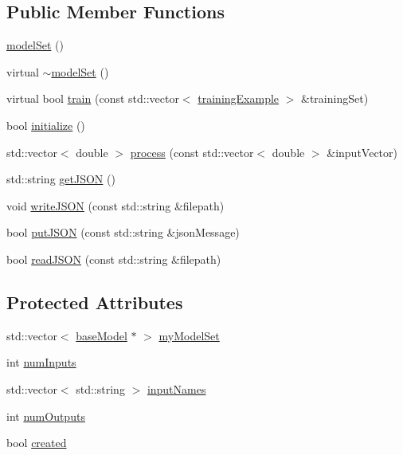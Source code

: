 \subsection*{Public Member Functions}
\begin{DoxyCompactItemize}
\item 
\hyperlink{classmodel_set_ae44cba85f4c52e7d05e0f622b3ea9030}{model\+Set} ()
\item 
virtual \hyperlink{classmodel_set_a21eadb6e6cdd54dda57a4a94582bfe7b}{$\sim$model\+Set} ()
\item 
virtual bool \hyperlink{classmodel_set_a7620f95e8e29d547e7c688da51b33d9c}{train} (const std\+::vector$<$ \hyperlink{structtraining_example}{training\+Example} $>$ \&training\+Set)
\item 
bool \hyperlink{classmodel_set_afefb50a0fe8f45821c6a7599784d7eb4}{initialize} ()
\item 
std\+::vector$<$ double $>$ \hyperlink{classmodel_set_a3b95db9f976d19764665e0761cae4a3c}{process} (const std\+::vector$<$ double $>$ \&input\+Vector)
\item 
std\+::string \hyperlink{classmodel_set_a031987885b1462ec7d7dbeef0c803d97}{get\+J\+S\+ON} ()
\item 
void \hyperlink{classmodel_set_a8e2b783240dded1be8fad921b10707bf}{write\+J\+S\+ON} (const std\+::string \&filepath)
\item 
bool \hyperlink{classmodel_set_a37dfe2eb4164986ccba8617da63a1dbc}{put\+J\+S\+ON} (const std\+::string \&json\+Message)
\item 
bool \hyperlink{classmodel_set_afd7886381e98dabea0771d9e7badc4da}{read\+J\+S\+ON} (const std\+::string \&filepath)
\end{DoxyCompactItemize}
\subsection*{Protected Attributes}
\begin{DoxyCompactItemize}
\item 
std\+::vector$<$ \hyperlink{classbase_model}{base\+Model} $\ast$ $>$ \hyperlink{classmodel_set_a390b0b864a8e727f481537b3c37aa721}{my\+Model\+Set}
\item 
int \hyperlink{classmodel_set_ad10fbc1228a85f1200cb89589ad92755}{num\+Inputs}
\item 
std\+::vector$<$ std\+::string $>$ \hyperlink{classmodel_set_ab4b67d7dbdf0659ba6bd18af7247e2ad}{input\+Names}
\item 
int \hyperlink{classmodel_set_addc0df56b9f1970c9816050634933716}{num\+Outputs}
\item 
bool \hyperlink{classmodel_set_a0029dc6f8ccfd77353ad38b48198ad7d}{created}
\end{DoxyCompactItemize}



